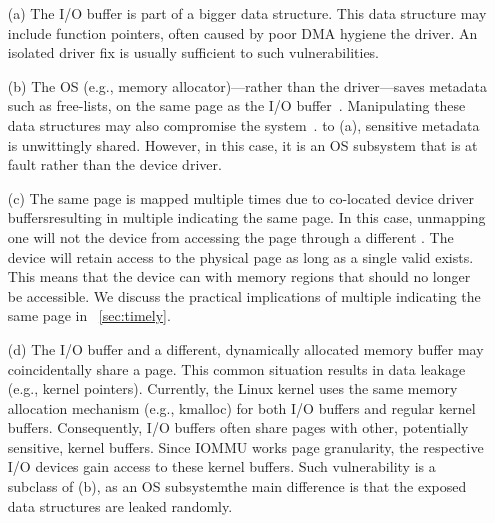 \begin{enumerate}
    \item[(a)] The I/O buffer is part of a bigger data structure. This data structure may include function pointers, often caused by poor DMA hygiene \DIFdelbegin {}\DIFdelend \DIFaddbegin {}\DIFaddend the driver. An isolated driver fix is usually sufficient to \DIFdelbegin {}\DIFdelend \DIFaddbegin {}\DIFaddend such vulnerabilities.
    \item[(b)] The OS (e.g., memory allocator)---rather than the driver---saves metadata \DIFdelbegin \DIFdel{, }\DIFdelend such as free-lists, on the same page as the I/O buffer~\cite{Cor07}. Manipulating these data structures may also compromise the system~\cite{ak09}. \DIFdelbegin {}\DIFdelend \DIFaddbegin {}\DIFaddend to (a), sensitive metadata is unwittingly shared. However, in this case, it is an OS subsystem that is at fault rather than the device driver.
    \item[(c)] The same page is mapped multiple times due to co-located device driver buffers\DIFaddbegin \DIFadd{, }\DIFaddend resulting in multiple \iova{}\DIFaddbegin {}\DIFaddend indicating the same page. 
    In this case, unmapping one \iova will not \DIFdelbegin {}\DIFdelend \DIFaddbegin {}\DIFaddend the device from accessing the page through a different \iova.
    The device will retain access to the physical page as long as a single valid \iova{} exists. This means that the device can \DIFdelbegin {}\DIFdelend \DIFaddbegin {}\DIFaddend with memory regions that should no longer be accessible\DIFdelbegin {}\DIFdelend . We discuss the practical implications of multiple \DIFdelbegin %
\DIFdelend \DIFaddbegin \iova{}\DIFaddend indicating the same page in \DIFdelbegin {}\DIFdelend \DIFaddbegin {}\DIFaddend ~\ref{sec:timely}.
    \item[(d)] The I/O buffer and a different, dynamically allocated memory buffer may coincidentally share a page. This common situation results in data leakage (e.g., kernel pointers). Currently, the Linux kernel uses the same memory allocation mechanism (e.g., kmalloc) for both I/O buffers and regular kernel buffers. Consequently, I/O buffers often share pages with other, potentially sensitive, kernel buffers. Since IOMMU works \DIFdelbegin {}\DIFdelend \DIFaddbegin {}\DIFaddend page granularity, the respective I/O devices gain access to these kernel buffers. Such vulnerability is a subclass of (b), as \DIFaddbegin {}\DIFaddend an OS subsystem\DIFdelbegin {}\DIFdelend \DIFaddbegin \DIFadd{; }\DIFaddend the main difference is that the exposed data structures are leaked randomly.
\end{enumerate}

